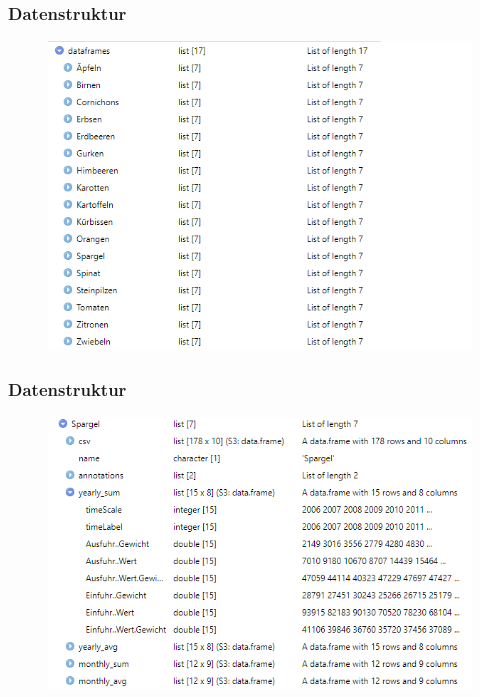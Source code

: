 \documentclass{beamer}
\begin{document}
\begin{frame}
	\frametitle{Datenstruktur}
	\begin{figure}[b]
		\centering
		\includegraphics[scale=0.6]{Marco_1_Folie_1}
	\end{figure}
\end{frame}

\begin{frame}
	\frametitle{Datenstruktur}
	\begin{figure}[b]
		\centering
		\includegraphics[scale=0.6]{Marco_1_Folie_2}
	\end{figure}
\end{frame}
\end{document}
